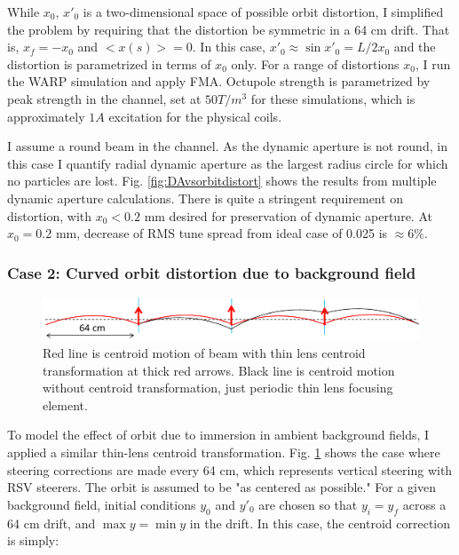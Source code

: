 While $x_0$, $x'_0$ is a two-dimensional space of possible orbit distortion, I simplified the problem by requiring that the distortion be symmetric in a 64 cm drift. That is, $x_f = -x_0$ and $<x(s)> = 0$. In this case, $x'_0 \approx \sin{x'_0} = L/2x_0$ and the distortion is parametrized in terms of $x_0$ only. For a range of distortions $x_0$, I run the WARP simulation and apply FMA. Octupole strength is parametrized by peak strength in the channel, set at $50 T/m^3$ for these simulations, which is approximately $1 A$ excitation for the physical coils. 
 
I assume a round beam in the channel. As the dynamic aperture is not round, in this case I quantify radial dynamic aperture as the largest radius circle for which no particles are lost. Fig. \ref{fig:DAvsorbitdistort} shows the results from multiple dynamic aperture calculations. There is quite a stringent requirement on distortion, with $x_0 < 0.2$ mm desired for preservation of dynamic aperture. At $x_0 = 0.2$ mm, decrease of RMS tune spread from ideal case of 0.025 is $\approx 6\%$.




\subsubsection{Case 2: Curved orbit distortion due to background field}

\begin{figure}
\centering
\includegraphics[width=\textwidth]{7.figures/steeringtolerance/vert_bg_field_distortion_cartoon.png}
\caption{Red line is centroid motion of beam with thin lens centroid transformation at thick red arrows. Black line is centroid motion without centroid transformation, just periodic thin lens focusing element.}
\label{fig:vertcurvedorbitdistortion}
\end{figure}

To model the effect of orbit  due to immersion in ambient background fields, I applied a similar thin-lens centroid transformation. Fig. \ref{fig:vertcurvedorbitdistortion} shows the case where steering corrections are made every 64 cm, which represents vertical steering with RSV steerers. The orbit is assumed to be "as centered as possible." For a given background field, initial conditions $y_0$ and $y'_0$ are chosen so that $y_i=y_f$ across a 64 cm drift, and $\max{y}=\min{y}$ in the drift. In this case, the centroid correction is simply:

